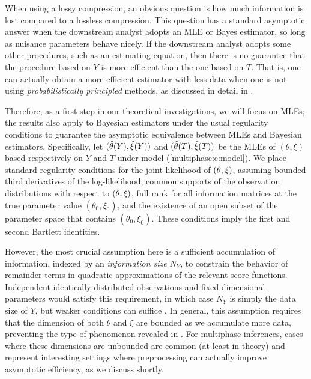 When using a lossy compression, an obvious question is how much information is lost compared to a lossless compression. This question has a standard asymptotic answer when the downstream analyst adopts an MLE or Bayes estimator, so long as nuisance parameters behave nicely. If the downstream analyst adopts some other procedures, such as an estimating equation, then there is no guarantee that the procedure based on $Y$ is more efficient than the one based on $T$. That is, one can actually obtain a more efficient estimator with less data when one is not using \textit{probabilistically principled}  methods, as  discussed in detail in  \citet{Meng2012}.

Therefore, as a first step in our theoretical investigations, we will focus on MLEs; the results also apply to Bayesian estimators under the usual regularity conditions to guarantee the asymptotic equivalence  between MLEs and Bayesian estimators. Specifically,  let $(\hat{\theta}(Y), \hat{\xi}(Y))$ and $(\hat{\theta}(T), \hat{\xi}(T))$ be the MLEs of $(\theta, \xi)$ based respectively on $Y$ and $T$ under model (\ref{multiphase:e:model}).  We place standard regularity conditions for the joint likelihood of $(\theta, \xi)$, assuming bounded third derivatives of the log-likelihood, common supports of the observation distributions with respect to $(\theta, \xi)$, full rank for all information matrices at the true parameter value $(\theta_0, \xi_0)$, and the existence of an open subset of the parameter space that contains $(\theta_0, \xi_0)$. These conditions imply the first and second Bartlett identities.

However, the most crucial assumption here is  a sufficient accumulation of information, indexed by an \textit{information size} $N_Y$, to constrain the behavior of remainder terms in quadratic approximations of the relevant score functions.
Independent identically distributed observations and fixed-dimensional parameters would satisfy this requirement, in which case $N_Y$ is simply the data size of $Y$,  but weaker conditions can suffice \citep[for an overview, see][]{Lehmann1998}.
In general, this assumption requires that the dimension of both $\theta$ and $\xi$ are bounded as we accumulate more data, preventing the type of phenomenon revealed in \citet{NeymanScott1948}. For multiphase inferences, cases where these dimensions are unbounded are common (at least in theory) and represent interesting settings where preprocessing can actually improve asymptotic efficiency, as we discuss shortly.    

